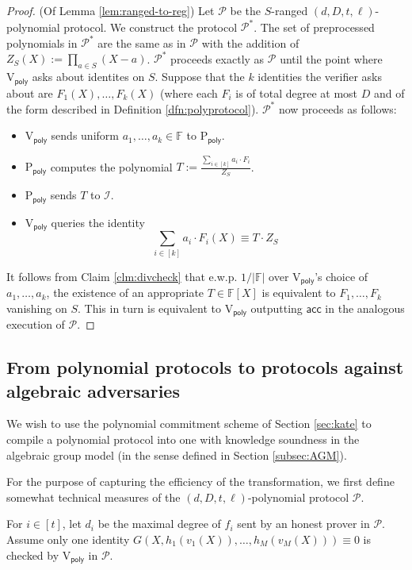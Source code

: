 \documentclass[11pt]{article} %
\newcommand{\F}{\ensuremath{\mathbb F}\xspace}
\newcommand{\polprot}[4]{$(#1,#2,#3,#4)$-polynomial protocol}
\newcommand{\rangedprot}[5]{$#5$-ranged $(#1,#2,#3,#4)$-polynomial protocol}
\newcommand{\acc}{\ensuremath{\mathsf{acc}}\xspace}
\newcommand{\defeq}{:=}
\newcommand{\prvpoly}{\ensuremath{\mathrm{P_{\mathsf{poly}}}}\xspace}
\newcommand{\verpoly}{\ensuremath{\mathrm{V_{\mathsf{poly}}}}\xspace}
\newcommand{\ideal}{\ensuremath{\mathcal{I}}\xspace}
\newcommand{\prot}{\ensuremath{\mathscr{P}}\xspace}
\newcommand{\protprime}{\ensuremath{\mathscr{P^*}}\xspace}
\begin{document}
\begin{proof}(Of Lemma \ref{lem:ranged-to-reg})
Let \prot be the \rangedprot{d}{D}{t}{\ell}{S}.
We construct the protocol \protprime.
The set of preprocessed polynomials in \protprime are the same as in \prot with the addition of $Z_S(X)\defeq \prod_{a\in S} (X-a)$.
\protprime proceeds exactly as \prot until the point where \verpoly asks about identites on $S$.
Suppose that the $k$ identities the verifier asks about are
$F_1(X),\ldots, F_k(X)$ (where each $F_i$ is of total degree at most $D$ and of the form described in Definition \ref{dfn:polyprotocol}).
\protprime now proceeds as follows:
\begin{itemize}
 \item \verpoly sends uniform $a_1,\ldots,a_k\in \F$ to \prvpoly.
\item \prvpoly computes the polynomial $T\defeq \frac{\sum_{i\in [k]}{a_i\cdot F_i}}{Z_S}$.
\item \prvpoly sends $T$ to \ideal.
\item \verpoly queries the identity
\[\sum_{i\in [k]} a_i\cdot F_i(X) \equiv T\cdot Z_S\]
 \end{itemize}
 
 It follows from Claim \ref{clm:divcheck} that e.w.p. $1/|\F|$ over \verpoly's choice of $a_1,\ldots,a_k$, the existence of an appropriate $T\in \F[X]$ is equivalent to $F_1,\ldots,F_k$ vanishing on $S$.
 This in turn is equivalent to \verpoly outputting \acc in the analogous execution of \prot.
\end{proof}


\subsection{From polynomial protocols to protocols against algebraic adversaries}\label{subsec:ideal-AGM}
We wish to use the polynomial commitment scheme of Section \ref{sec:kate} to compile a polynomial protocol into one with knowledge soundness in the algebraic group model (in the sense defined in Section \ref{subsec:AGM}).


For the purpose of capturing the efficiency of the transformation, we first define somewhat technical measures of the  \polprot{d}{D}{t}{\ell} \prot.




For $i\in [t]$, let $d_i$ be the maximal degree of $f_i$ sent by an honest prover in \prot.
Assume only one identity 
$G(X, h_1(v_1(X)),\ldots,h_M(v_M(X)))\equiv 0$
is checked by \verpoly in \prot.
\end{document}
